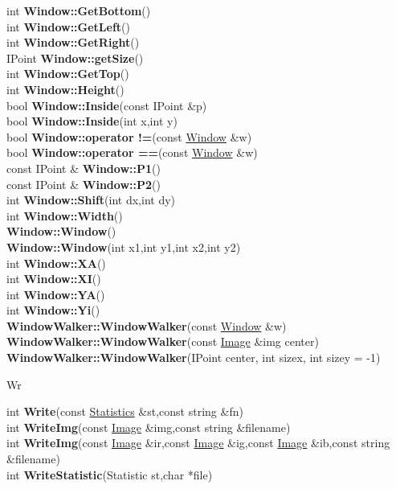 \documentclass[10pt,titlepage]{article}
\def\functionlistentry#1#2#3#4#5#6{\noindent #1 {\bf #2}(#3) \dotfill #6\\}
\def\letterref#1{}
\def\letterlabel#1{\vspace{0.5cm}\centerline{\Large #1}}
\def\letterlabelend#1{}
\begin{document}
{{\letterref{Wa}
\letterref{We}
\letterref{Wh}
\letterref{Wi}
\letterref{Wr}
\letterref{Ws}
\letterlabelend{Wi}
\functionlistentry{int}{Window::GetBottom}{}{214}{datastructures}{}
\functionlistentry{int}{Window::GetLeft}{}{208}{datastructures}{}
\functionlistentry{int}{Window::GetRight}{}{210}{datastructures}{}
\functionlistentry{IPoint}{Window::getSize}{}{218}{datastructures}{}
\functionlistentry{int}{Window::GetTop}{}{212}{datastructures}{}
\functionlistentry{int}{Window::Height}{}{207}{datastructures}{}
\functionlistentry{bool}{Window::Inside}{const IPoint \&p}{219}{datastructures}{}
\functionlistentry{bool}{Window::Inside}{int x,int y}{220}{datastructures}{}
\functionlistentry{bool}{Window::operator !=}{const \hyperlink{Window}{Window} \&w}{222}{datastructures}{}
\functionlistentry{bool}{Window::operator ==}{const \hyperlink{Window}{Window} \&w}{221}{datastructures}{}
\functionlistentry{const IPoint \&}{Window::P1}{}{216}{datastructures}{}
\functionlistentry{const IPoint \&}{Window::P2}{}{217}{datastructures}{}
\functionlistentry{int}{Window::Shift}{int dx,int dy}{223}{datastructures}{}
\functionlistentry{int}{Window::Width}{}{206}{datastructures}{}
\functionlistentry{}{Window::Window}{}{204}{datastructures}{}
\functionlistentry{}{Window::Window}{int x1,int y1,int x2,int y2}{205}{datastructures}{}
\functionlistentry{int}{Window::XA}{}{211}{datastructures}{}
\functionlistentry{int}{Window::XI}{}{209}{datastructures}{}
\functionlistentry{int}{Window::YA}{}{215}{datastructures}{}
\functionlistentry{int}{Window::Yi}{}{213}{datastructures}{}
\functionlistentry{}{WindowWalker::WindowWalker}{const \hyperlink{Window}{Window} \&w}{182}{datastructures}{}
\functionlistentry{}{WindowWalker::WindowWalker}{const \hyperlink{Image}{Image} \&img center}{183}{datastructures}{}
\functionlistentry{}{WindowWalker::WindowWalker}{IPoint center, int sizex, int sizey = -1}{184}{datastructures}{}

\letterlabel{Wr}
\letterref{A}
\letterref{B}
\letterref{C}
\letterref{D}
\letterref{E}
\letterref{F}
\letterref{G}
\letterref{H}
\letterref{I}
\letterref{K}
\letterref{L}
\letterref{M}
\letterref{N}
\letterref{O}
\letterref{P}
\letterref{Q}
\letterref{R}
\letterref{S}
\letterref{T}
\letterref{U}
\letterref{V}
\letterref{W}
\letterref{X}
\letterref{Y}
\letterref{Z}

\letterref{Wa}
\letterref{We}
\letterref{Wh}
\letterref{Wi}
\letterref{Wr}
\letterref{Ws}
\letterlabelend{Wr}
\functionlistentry{int}{Write}{const \hyperlink{Statistics}{Statistics} \&st,const string \&fn}{872}{statistics}{}
\functionlistentry{int}{WriteImg}{const \hyperlink{Image}{Image} \&img,const string \&filename}{114}{imageio}{}
\functionlistentry{int}{WriteImg}{const \hyperlink{Image}{Image} \&ir,const \hyperlink{Image}{Image} \&ig,const \hyperlink{Image}{Image} \&ib,const string \&filename}{116}{imageio}{}
\functionlistentry{int}{WriteStatistic}{Statistic st,char *file}{1601}{obsolet}{}

}}
\end{document}
